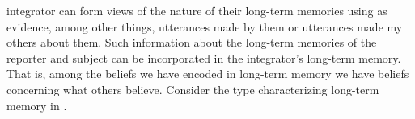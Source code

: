 integrator can form views of the nature of their long-term memories
using as evidence, among other things, utterances made by them or utterances made
my others about them.  Such information about the
long-term memories of the reporter and subject can be incorporated in
the integrator's long-term memory.  That is, among the beliefs we have
encoded in long-term memory we have beliefs concerning what others
believe.  Consider the type characterizing long-term memory in
\nexteg{}.
\begin{ex} 
\end{ex}
